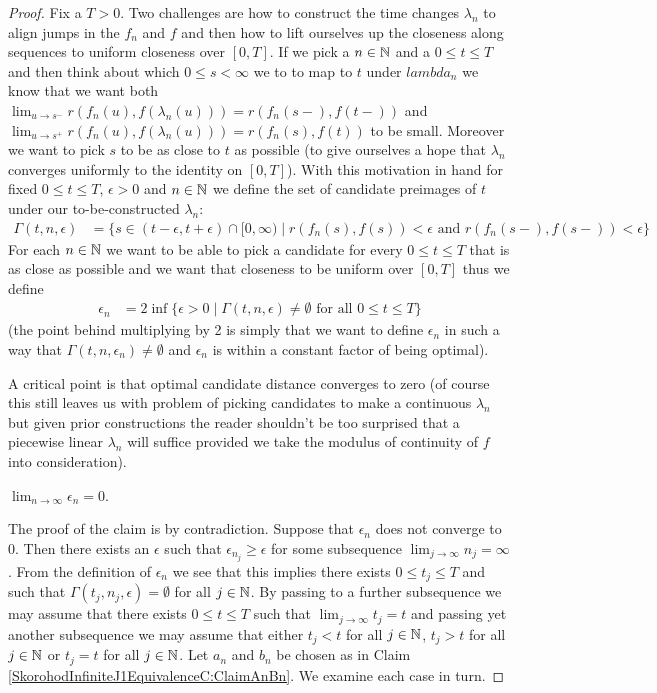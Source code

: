 \begin{proof}
Fix a $T > 0$.  Two challenges are how to construct the time changes $\lambda_n$ to align jumps in the $f_n$ and $f$ and then how to lift ourselves up the closeness along sequences to uniform closeness over $[0,T]$.  If we pick a $n \in \mathbb{N}$ and a $0 \leq t \leq T$ and then think about which $0 \leq s < \infty$ we to to map to $t$ under $lambda_n$ we know that we want both $\lim_{u \to s^-} r(f_n(u), f(\lambda_n(u))) = r(f_n(s-), f(t-))$ and $\lim_{u \to  s^+} r(f_n(u), f(\lambda_n(u))) = r(f_n(s), f(t))$ to be small.  Moreover we want to pick $s$ to be as close to $t$ as possible (to give ourselves a hope that $\lambda_n$ converges uniformly to the identity on $[0,T]$).  With this motivation in hand for fixed $0 \leq t \leq T$, $\epsilon > 0$ and $n \in \mathbb{N}$ we define the set of candidate preimages of $t$ under our to-be-constructed $\lambda_n$:
\begin{align*}
\Gamma(t, n, \epsilon) &= \lbrace s \in (t - \epsilon, t+\epsilon) \cap [0,\infty) \mid r(f_n(s), f(s)) < \epsilon \text{ and } r(f_n(s-), f(s-)) < \epsilon \rbrace
\end{align*}
For each $n \in \mathbb{N}$ we want to be able to pick a candidate for every $0 \leq t \leq T$ that is as close as possible and we want that closeness to be uniform over $[0,T]$ thus we define
\begin{align*}
\epsilon_n &= 2 \inf \lbrace \epsilon > 0 \mid \Gamma(t,n, \epsilon) \neq \emptyset \text{ for all } 0\leq t \leq T \rbrace
\end{align*}
(the point behind multiplying by 2 is simply that we want to define $\epsilon_n$ in such a way that $\Gamma(t, n, \epsilon_n) \neq \emptyset$ and $\epsilon_n$ is within a constant factor of being optimal).

A critical point is that optimal candidate distance converges to zero (of course this still leaves us with problem of picking candidates to make a continuous $\lambda_n$ but given prior constructions the reader shouldn't be too surprised that a piecewise linear $\lambda_n$ will suffice provided we take the modulus of continuity of $f$ into consideration).  
\begin{clm} $\lim_{n \to \infty} \epsilon_n = 0$.
\end{clm}
The proof of the claim is by contradiction.  Suppose that $\epsilon_n$ does not converge to $0$.  Then there exists an $\epsilon$ such that $\epsilon_{n_j} \geq \epsilon$ for some subsequence $\lim_{j \to \infty} n_j = \infty$.  From the definition of $\epsilon_n$ we see that this implies there exists $0 \leq t_j \leq T$ and such that $\Gamma(t_j, n_j, \epsilon) = \emptyset$ for all $j \in \mathbb{N}$.  By passing to a further subsequence we may assume that there exists $0 \leq t \leq T$ such that $\lim_{j \to \infty} t_j = t$ and passing yet another subsequence we may assume that either $t_j < t$ for all $j \in \mathbb{N}$, $t_j > t$ for all $j \in \mathbb{N}$ or $t_j=t$ for all $j \in \mathbb{N}$.  Let $a_n$ and $b_n$ be chosen as in Claim \ref{SkorohodInfiniteJ1EquivalenceC:ClaimAnBn}.  We examine each case in turn.


\end{proof}
